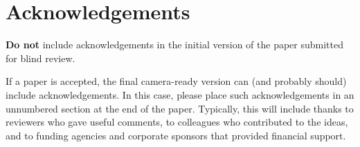 \documentclass{article}
\begin{document}
\section*{Acknowledgements} 
 
\textbf{Do not} include acknowledgements in the initial version of
the paper submitted for blind review.

If a paper is accepted, the final camera-ready version can (and
probably should) include acknowledgements. In this case, please
place such acknowledgements in an unnumbered section at the
end of the paper. Typically, this will include thanks to reviewers
who gave useful comments, to colleagues who contributed to the ideas, 
and to funding agencies and corporate sponsors that provided financial 
support.  


\nocite{langley00}
\fi



\end{document}
